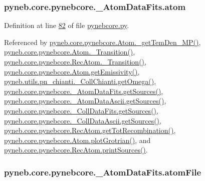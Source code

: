\subsubsection[{atom}]{\setlength{\rightskip}{0pt plus 5cm}pyneb.\+core.\+pynebcore.\+\_\+\+Atom\+Data\+Fits.\+atom}\label{classpyneb_1_1core_1_1pynebcore_1_1___atom_data_fits_a489ba89fa2e99786afc077e82acace4c}


Definition at line \hyperlink{pynebcore_8py_source_l00082}{82} of file \hyperlink{pynebcore_8py_source}{pynebcore.\+py}.



Referenced by \hyperlink{pynebcore_8py_source_l01980}{pyneb.\+core.\+pynebcore.\+Atom.\+\_\+get\+Tem\+Den\+\_\+\+M\+P()}, \hyperlink{pynebcore_8py_source_l01367}{pyneb.\+core.\+pynebcore.\+Atom.\+\_\+\+Transition()}, \hyperlink{pynebcore_8py_source_l02696}{pyneb.\+core.\+pynebcore.\+Rec\+Atom.\+\_\+\+Transition()}, \hyperlink{pynebcore_8py_source_l01716}{pyneb.\+core.\+pynebcore.\+Atom.\+get\+Emissivity()}, \hyperlink{pn__chianti_8py_source_l00484}{pyneb.\+utils.\+pn\+\_\+chianti.\+\_\+\+Coll\+Chianti.\+get\+Omega()}, \hyperlink{pynebcore_8py_source_l00183}{pyneb.\+core.\+pynebcore.\+\_\+\+Atom\+Data\+Fits.\+get\+Sources()}, \hyperlink{pynebcore_8py_source_l00448}{pyneb.\+core.\+pynebcore.\+\_\+\+Atom\+Data\+Ascii.\+get\+Sources()}, \hyperlink{pynebcore_8py_source_l00673}{pyneb.\+core.\+pynebcore.\+\_\+\+Coll\+Data\+Fits.\+get\+Sources()}, \hyperlink{pynebcore_8py_source_l01003}{pyneb.\+core.\+pynebcore.\+\_\+\+Coll\+Data\+Ascii.\+get\+Sources()}, \hyperlink{pynebcore_8py_source_l02735}{pyneb.\+core.\+pynebcore.\+Rec\+Atom.\+get\+Tot\+Recombination()}, \hyperlink{pynebcore_8py_source_l02372}{pyneb.\+core.\+pynebcore.\+Atom.\+plot\+Grotrian()}, and \hyperlink{pynebcore_8py_source_l02796}{pyneb.\+core.\+pynebcore.\+Rec\+Atom.\+print\+Sources()}.

\hypertarget{classpyneb_1_1core_1_1pynebcore_1_1___atom_data_fits_add12b2ae3c11a68438ebf4bcf79fd6d0}{}
\subsubsection[{atom\+File}]{\setlength{\rightskip}{0pt plus 5cm}pyneb.\+core.\+pynebcore.\+\_\+\+Atom\+Data\+Fits.\+atom\+File}\label{classpyneb_1_1core_1_1pynebcore_1_1___atom_data_fits_add12b2ae3c11a68438ebf4bcf79fd6d0}


